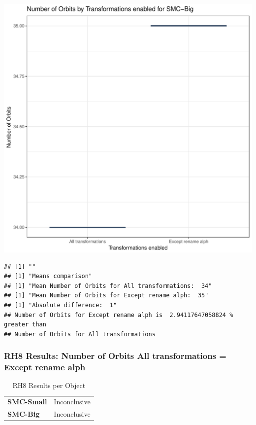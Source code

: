 \documentclass{article}\usepackage[]{graphicx}\usepackage[]{color}
\makeatletter
\def\maxwidth{ %
  \ifdim\Gin@nat@width>\linewidth
    \linewidth
  \else
    \Gin@nat@width
  \fi
}
\newenvironment{kframe}{%
 \def\at@end@of@kframe{}%
 \ifinner\ifhmode%
  \def\at@end@of@kframe{\end{minipage}}%
  \begin{minipage}{\columnwidth}%
 \fi\fi%
 \def\FrameCommand##1{\hskip\@totalleftmargin \hskip-\fboxsep
 \colorbox{shadecolor}{##1}\hskip-\fboxsep
     \hskip-\linewidth \hskip-\@totalleftmargin \hskip\columnwidth}%
 \MakeFramed {\advance\hsize-\width
   \@totalleftmargin\z@ \linewidth\hsize
   \@setminipage}}%
 {\par\unskip\endMakeFramed%
 \at@end@of@kframe}
\newenvironment{knitrout}{}{} %
\makeatother
\begin{document}
\begin{knitrout}
\color{fgcolor}
\includegraphics[width=\maxwidth]{figure/RH8_big-1} 
\begin{kframe}

{\ttfamily\noindent\bfseries\color{errorcolor}{\#\# Error in eval(expr, envir, enclos): object 'shap\_cashew\_big' not found}}\begin{verbatim}
## [1] ""
## [1] "Means comparison"
## [1] "Mean Number of Orbits for All transformations:  34"
## [1] "Mean Number of Orbits for Except rename alph:  35"
## [1] "Absolute difference:  1"
## Number of Orbits for Except rename alph is  2.94117647058824 % greater than 
## Number of Orbits for All transformations
\end{verbatim}
\end{kframe}
\end{knitrout}


 

	
	\subsubsection{RH8 Results: Number of Orbits All transformations = Except rename alph}
	
	
	\begin{table}[H]
	\centering
	\caption{RH8 Results per Object}
	\begin{tabular}{ll}
	\textbf{SMC-Small} & Inconclusive \\
	\textbf{SMC-Big} & Inconclusive \\
	\end{tabular}
	\end{table}
\end{document}
